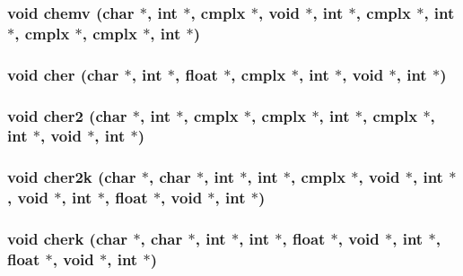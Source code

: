 \subsubsection{\setlength{\rightskip}{0pt plus 5cm}void chemv (char $\ast$, int $\ast$, {\bf cmplx} $\ast$, void $\ast$, int $\ast$, {\bf cmplx} $\ast$, int $\ast$, {\bf cmplx} $\ast$, {\bf cmplx} $\ast$, int $\ast$)}\label{essl_8h_889fb62ffc54323039945af09ce05796}


\subsubsection{\setlength{\rightskip}{0pt plus 5cm}void cher (char $\ast$, int $\ast$, float $\ast$, {\bf cmplx} $\ast$, int $\ast$, void $\ast$, int $\ast$)}\label{essl_8h_e21316368d39fa537d28ec1cdca4d360}


\subsubsection{\setlength{\rightskip}{0pt plus 5cm}void cher2 (char $\ast$, int $\ast$, {\bf cmplx} $\ast$, {\bf cmplx} $\ast$, int $\ast$, {\bf cmplx} $\ast$, int $\ast$, void $\ast$, int $\ast$)}\label{essl_8h_81907ab9b08c7d441c65e22dd8e2410e}


\subsubsection{\setlength{\rightskip}{0pt plus 5cm}void cher2k (char $\ast$, char $\ast$, int $\ast$, int $\ast$, {\bf cmplx} $\ast$, void $\ast$, int $\ast$, void $\ast$, int $\ast$, float $\ast$, void $\ast$, int $\ast$)}\label{essl_8h_177426fd2631287e6a0b82322c584f8b}


\subsubsection{\setlength{\rightskip}{0pt plus 5cm}void cherk (char $\ast$, char $\ast$, int $\ast$, int $\ast$, float $\ast$, void $\ast$, int $\ast$, float $\ast$, void $\ast$, int $\ast$)}\label{essl_8h_887753ee958aef36c69084d30bd3aa74}


